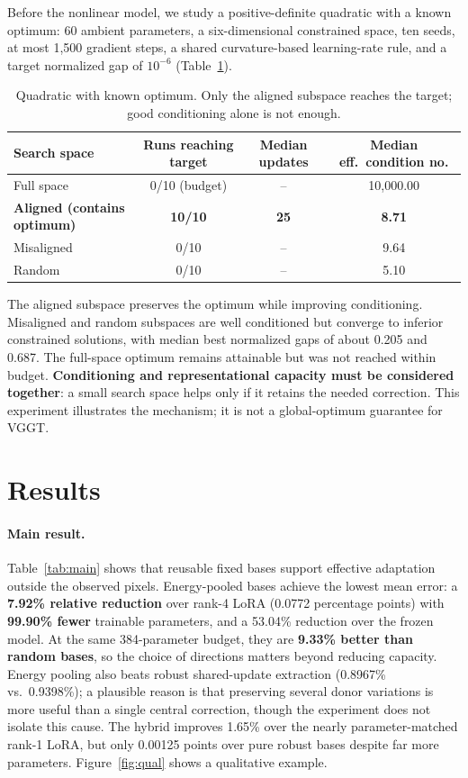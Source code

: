 \documentclass{article}
\begin{document}
Before the nonlinear model, we study a positive-definite quadratic with a known optimum: 60 ambient parameters, a six-dimensional constrained space, ten seeds, at most 1,500 gradient steps, a shared curvature-based learning-rate rule, and a target normalized gap of $10^{-6}$ (Table~\ref{tab:quad}).

\begin{table}[h]
  \caption{Quadratic with known optimum. Only the aligned subspace reaches the target; good conditioning alone is not enough.}
  \label{tab:quad}
  \centering
  \small
  \begin{tabular}{lccc}
    \toprule
    Search space & Runs reaching target & Median updates & Median eff.\ condition no. \\
    \midrule
    Full space & 0/10 (budget) & -- & 10,000.00 \\
    \textbf{Aligned (contains optimum)} & \textbf{10/10} & \textbf{25} & \textbf{8.71} \\
    Misaligned & 0/10 & -- & 9.64 \\
    Random & 0/10 & -- & 5.10 \\
    \bottomrule
  \end{tabular}
\end{table}

The aligned subspace preserves the optimum while improving conditioning. Misaligned and random subspaces are well conditioned but converge to inferior constrained solutions, with median best normalized gaps of about 0.205 and 0.687. The full-space optimum remains attainable but was not reached within budget. \textbf{Conditioning and representational capacity must be considered together}: a small search space helps only if it retains the needed correction. This experiment illustrates the mechanism; it is not a global-optimum guarantee for VGGT.

\section{Results}

\paragraph{Main result.} Table~\ref{tab:main} shows that reusable fixed bases support effective adaptation outside the observed pixels. Energy-pooled bases achieve the lowest mean error: a \textbf{7.92\% relative reduction} over rank-4 LoRA (0.0772 percentage points) with \textbf{99.90\% fewer} trainable parameters, and a 53.04\% reduction over the frozen model. At the same 384-parameter budget, they are \textbf{9.33\% better than random bases}, so the choice of directions matters beyond reducing capacity. Energy pooling also beats robust shared-update extraction (0.8967\% vs.\ 0.9398\%); a plausible reason is that preserving several donor variations is more useful than a single central correction, though the experiment does not isolate this cause. The hybrid improves 1.65\% over the nearly parameter-matched rank-1 LoRA, but only 0.00125 points over pure robust bases despite far more parameters. Figure~\ref{fig:qual} shows a qualitative example.
\end{document}
